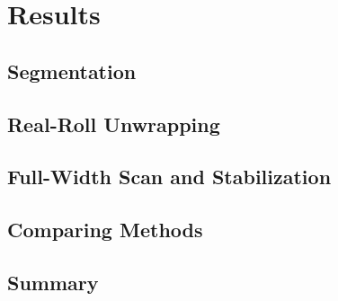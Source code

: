 \chapter{Results}
\label{chap:results}

\section{Segmentation}
\label{sec:res-segmentation}

\section{Real-Roll Unwrapping}
\label{sec:res-emulsion-walk}

\section{Full-Width Scan and Stabilization}
\label{sec:res-fullwidth}

\section{Comparing Methods}
\label{sec:res-comparison}

\section{Summary}
\label{sec:res-summary}
